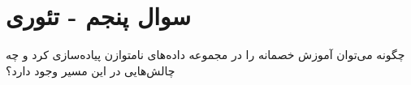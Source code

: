 \section{سوال پنجم - تئوری}
چگونه می‌توان آموزش خصمانه را در مجموعه داده‌های نامتوازن پیاده‌سازی کرد و چه چالش‌هایی در این مسیر وجود دارد؟





\begin{qsolve}
	
\end{qsolve}